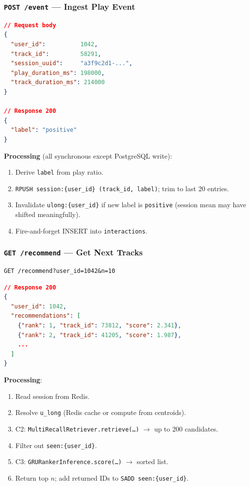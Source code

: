 \documentclass[11pt]{article}
\begin{document}
\subsubsection{\texttt{POST /event} --- Ingest Play Event}

\begin{lstlisting}[language=json]
// Request body
{
  "user_id":          1042,
  "track_id":         58291,
  "session_uuid":     "a3f9c2d1-...",
  "play_duration_ms": 198000,
  "track_duration_ms": 214000
}

// Response 200
{
  "label": "positive"
}
\end{lstlisting}

\textbf{Processing} (all synchronous except PostgreSQL write):
\begin{enumerate}[leftmargin=1.5em, topsep=2pt]
  \item Derive \texttt{label} from play ratio.
  \item \texttt{RPUSH session:\{user\_id\} (track\_id, label)}; trim to last 20 entries.
  \item Invalidate \texttt{ulong:\{user\_id\}} if new label is \texttt{positive}
        (session mean may have shifted meaningfully).
  \item Fire-and-forget INSERT into \texttt{interactions}.
\end{enumerate}

\subsubsection{\texttt{GET /recommend} --- Get Next Tracks}

\begin{lstlisting}
GET /recommend?user_id=1042&n=10
\end{lstlisting}

\begin{lstlisting}[language=json]
// Response 200
{
  "user_id": 1042,
  "recommendations": [
    {"rank": 1, "track_id": 73812, "score": 2.341},
    {"rank": 2, "track_id": 41205, "score": 1.987},
    ...
  ]
}
\end{lstlisting}

\textbf{Processing}:
\begin{enumerate}[leftmargin=1.5em, topsep=2pt]
  \item Read session from Redis.
  \item Resolve \texttt{u\_long} (Redis cache or compute from centroids).
  \item C2: \texttt{MultiRecallRetriever.retrieve(\ldots)} $\to$ up to 200 candidates.
  \item Filter out \texttt{seen:\{user\_id\}}.
  \item C3: \texttt{GRURankerInference.score(\ldots)} $\to$ sorted list.
  \item Return top $n$; add returned IDs to \texttt{SADD seen:\{user\_id\}}.
\end{enumerate}
\end{document}
